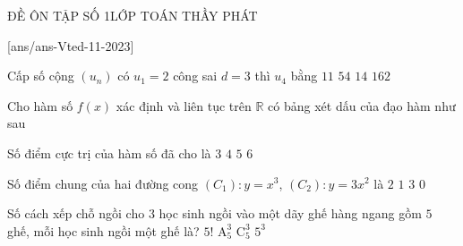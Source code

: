 \begin{name}
	{\tenchude}{ĐỀ ÔN TẬP SỐ 1}{LỚP TOÁN THẦY PHÁT}{\thoigian}
\end{name}
\setcounter{ex}{0}
\setcounter{bt}{0}
[ans/ans-Vted-11-2023]

\begin{ex}%
	Cấp số cộng $\left(u_{n}\right)$ có $u_{1}=2$ công sai $d=3$ thì $u_{4}$ bằng
	\choice
	{\True $11$}
	{$54$}
	{$14$}
	{$162$}
\end{ex}

\begin{ex}%
	Cho hàm số $f(x)$ xác định và liên tục trên $\mathbb{R}$ có bảng xét dấu của đạo hàm như sau
	\begin{center}
	\end{center}
	Số điểm cực trị của hàm số đã cho là
	\choice
	{$3$}
	{$4$}
	{\True $5$}
	{$6$}
\end{ex}

\begin{ex}%
	Số điểm chung của hai đường cong $\left(C_{1}\right)\colon y=x^{3}$, $\left(C_{2}\right)\colon y=3x^{2}$ là
	\choice
	{\True $2$}
	{$1$}
	{$3$}
	{$0$}
\end{ex}

\begin{ex}%
	Số cách xếp chỗ ngồi cho $3$ học sinh ngồi vào một dãy ghế hàng ngang gồm $5$ ghế, mỗi học sinh ngồi một ghế là?
	\choice
	{$5!$}
	{\True $\mathrm{A}_{5}^{3}$}
	{$\mathrm{C}_{5}^{3}$}
	{$5^{3}$}
\end{ex}

